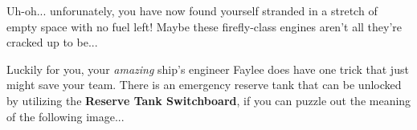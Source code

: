 Uh-oh... unforunately, you have now found yourself stranded
in a stretch of empty space with no fuel left! Maybe these firefly-class
engines aren't all they're cracked up to be...

Luckily for you,
your \textit{amazing} ship's engineer Faylee does have one trick that
just might save your team. There is
an emergency reserve tank that can be unlocked by utilizing the
\textbf{Reserve Tank Switchboard}, if you can puzzle out the meaning
of the following image...

\begin{center}
\end{center} 
